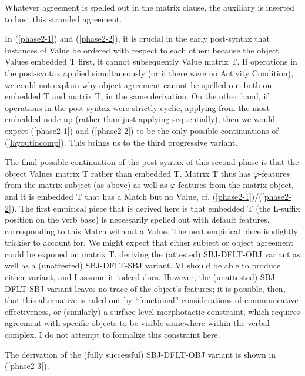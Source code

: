\documentclass[output=paper
,modfonts
,nonflat]{langsci/langscibook}
\begin{document}
\noindent Whatever agreement is spelled out in the matrix clause, the auxiliary is inserted to host this stranded agreement. 

In (\ref{phase2-1}) and (\ref{phase2-2}), it is crucial in the early post-syntax that instances of Value be ordered with respect to each other: because the object Values embedded T first, it cannot subsequently Value matrix T. If operations in the post-syntax applied simultaneously (or if there were no Activity Condition), we could not explain why object agreement cannot be spelled out both on embedded T and matrix T, in the same derivation. On the other hand, if operations in the post-syntax were strictly cyclic, applying from the most embedded node up (rather than just applying sequentially), then we would expect (\ref{phase2-1}) and (\ref{phase2-2}) to be the only possible continuations of (\ref{layoutincomp}). This brings us to the third progressive variant.

The final possible continuation of the post-syntax of this second phase is that the object Values matrix T rather than embedded T. Matrix T thus has $\varphi$-features from the matrix subject (as above) as well as $\varphi$-features from the matrix object, and it is embedded T that has a Match but no Value, cf. (\ref{phase2-1})/(\ref{phase2-2}). The first empirical piece that is derived here is that embedded T (the L-suffix position on the verb base) is necessarily spelled out with default features, corresponding to this Match without a Value. The next empirical piece is slightly trickier to account for. We might expect that either subject or object agreement could be exponed on matrix T, deriving the (attested) SBJ-DFLT-OBJ variant as well as a (unattested) SBJ-DFLT-SBJ variant. VI should be able to produce either variant, and I assume it indeed does. However, the (unattested) SBJ-DFLT-SBJ variant leaves no trace of the object's features; it is possible, then, that this alternative is ruled out by ``functional'' considerations of communicative effectiveness, or (similarly) a surface-level morphotactic constraint, which requires agreement with specific objects to be visible somewhere within the verbal complex. I do not attempt to formalize this constraint here.

The derivation of the (fully successful) SBJ-DFLT-OBJ variant is shown in (\ref{phase2-3}).
\end{document}

